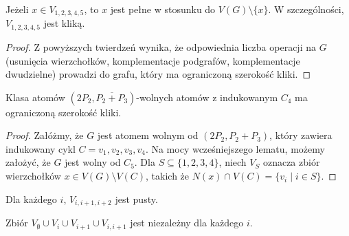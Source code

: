 \documentclass[polish]{beamer}
\begin{document}
\begin{frame}
    \begin{theorem}
        \renewcommand{\qedsymbol}{}
        Jeżeli $x \in V_{1,2,3,4,5}$, to $x$ jest pełne w stosunku do $V(G) \setminus \{x\}$. W szczególności, $V_{1,2,3,4,5}$ jest kliką.
    \end{theorem}
    \graphBigger
\end{frame}

\begin{frame}
    \begin{proof}      
        Z powyższych twierdzeń wynika, że odpowiednia liczba operacji na $G$ (usunięcia wierzchołków, komplementacje podgrafów, komplementacje dwudzielne) prowadzi do grafu, który ma ograniczoną szerokość kliki.
        \end{proof}
\end{frame}

\begin{frame}
    \begin{lemma}
        Klasa atomów $(2P_2, \overline{P_2 + P_3})$-wolnych atomów z indukowanym $C_4$ ma ograniczoną szerokość kliki.
    \end{lemma}
    \begin{proof}
        \renewcommand{\qedsymbol}{}
        Załóżmy, że $G$ jest atomem wolnym od $(2P_2, P_2 + P_3)$, który zawiera indukowany cykl $C = v_1, v_2, v_3, v_4$. Na mocy wcześniejszego lematu, możemy założyć, że $G$ jest wolny od $C_5$. Dla $S \subseteq \{1, 2, 3, 4\}$, niech $V_S$ oznacza zbiór wierzchołków $x \in V(G) \setminus V(C)$, takich że $N(x) \cap V(C) = \{v_i \mid i \in S\}$.
    \end{proof}
\end{frame}

\begin{frame}
    \begin{theorem}
        \renewcommand{\qedsymbol}{}
        Dla każdego $i$, $V_{i,i+1,i+2}$ jest pusty.
    \end{theorem}
    \graphSmaller
\end{frame}

\begin{frame}
    \begin{theorem}
        \renewcommand{\qedsymbol}{}
        Zbiór $V_\emptyset \cup V_i \cup V_{i+1} \cup V_{i,i+1}$ jest niezależny dla każdego $i$.
    \end{theorem}
    \graphSmaller
\end{frame}
\end{document}
